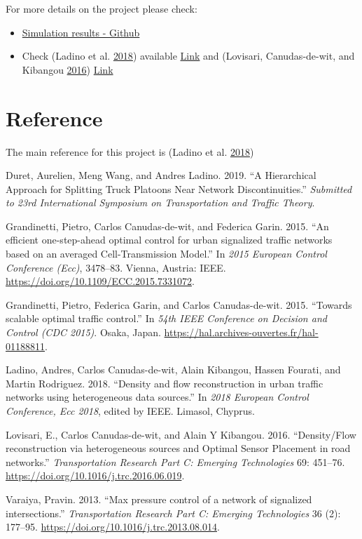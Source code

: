 \documentclass[]{book}
\theoremstyle{definition}
\theoremstyle{definition}
\theoremstyle{definition}
\theoremstyle{remark}
\begin{document}
For more details on the project please check:

\begin{itemize}
\item
  \href{https://github.com/aladinoster/density-reconstruction}{Simulation
  results - Github}
\item
  Check (Ladino et al. \protect\hyperlink{ref-Ladino2018}{2018})
  available \href{https://hal.archives-ouvertes.fr/hal-01731356}{Link}
  and (Lovisari, Canudas-de-wit, and Kibangou
  \protect\hyperlink{ref-Lovisari2016}{2016})
  \href{https://hal.archives-ouvertes.fr/hal-01375928}{Link}
\end{itemize}

\hypertarget{reference}{%
\section*{Reference}\label{reference}}

The main reference for this project is (Ladino et al.
\protect\hyperlink{ref-Ladino2018}{2018})

\hypertarget{refs}{}
\leavevmode\hypertarget{ref-Duret2019}{}%
Duret, Aurelien, Meng Wang, and Andres Ladino. 2019. ``A Hierarchical
Approach for Splitting Truck Platoons Near Network Discontinuities.''
\emph{Submitted to 23rd International Symposium on Transportation and
Traffic Theory}.

\leavevmode\hypertarget{ref-Grandinetti2015}{}%
Grandinetti, Pietro, Carlos Canudas-de-wit, and Federica Garin. 2015.
``An efficient one-step-ahead optimal control for urban signalized
traffic networks based on an averaged Cell-Transmission Model.'' In
\emph{2015 European Control Conference (Ecc)}, 3478--83. Vienna,
Austria: IEEE. \url{https://doi.org/10.1109/ECC.2015.7331072}.

\leavevmode\hypertarget{ref-Grandinetti2016}{}%
Grandinetti, Pietro, Federica Garin, and Carlos Canudas-de-wit. 2015.
``Towards scalable optimal traffic control.'' In \emph{54th IEEE
Conference on Decision and Control (CDC 2015)}. Osaka, Japan.
\url{https://hal.archives-ouvertes.fr/hal-01188811}.

\leavevmode\hypertarget{ref-Ladino2018}{}%
Ladino, Andres, Carlos Canudas-de-wit, Alain Kibangou, Hassen Fourati,
and Martin Rodriguez. 2018. ``Density and flow reconstruction in urban
traffic networks using heterogeneous data sources.'' In \emph{2018
European Control Conference, Ecc 2018}, edited by IEEE. Limasol,
Chyprus.

\leavevmode\hypertarget{ref-Lovisari2016}{}%
Lovisari, E., Carlos Canudas-de-wit, and Alain Y Kibangou. 2016.
``Density/Flow reconstruction via heterogeneous sources and Optimal
Sensor Placement in road networks.'' \emph{Transportation Research Part
C: Emerging Technologies} 69: 451--76.
\url{https://doi.org/10.1016/j.trc.2016.06.019}.

\leavevmode\hypertarget{ref-Varaiya2013:TR-C}{}%
Varaiya, Pravin. 2013. ``Max pressure control of a network of signalized
intersections.'' \emph{Transportation Research Part C: Emerging
Technologies} 36 (2): 177--95.
\url{https://doi.org/10.1016/j.trc.2013.08.014}.
\end{document}
